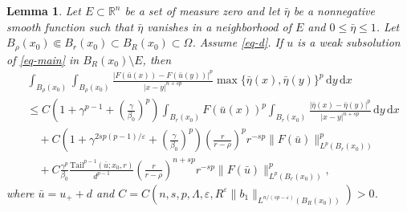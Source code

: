 \documentclass[11pt]{amsart}
\theoremstyle{plain}
\newtheorem{lemma}[theorem]{Lemma}
\theoremstyle{definition}
\numberwithin{equation}{section}
\begin{document}
\begin{lemma}\label{lem-Caccio2}
Let $E \subset \mathbb{R}^n$ be a set of measure zero and let $\bar{\eta}$ be a nonnegative smooth function such that $\bar{\eta}$ vanishes in a neighborhood of $E$ and $0\leq\bar{\eta}\leq1$. Let $B_\rho(x_0) \Subset B_r(x_0) \subset B_R(x_0) \subset \Omega$. Assume \eqref{eq-d}. If $u$ is a weak subsolution of \eqref{eq-main} in $B_R(x_0) \setminus E$, then
\begin{equation}\label{eq-Caccio2}
\begin{split}
&\int_{B_\rho(x_0)} \int_{B_\rho(x_0)} \frac{|F(\bar{u}(x))-F(\bar{u}(y))|^p}{|x-y|^{n+sp}} \max\{ \bar{\eta}(x), \bar{\eta}(y) \}^p \,\mathrm{d}y \,\mathrm{d}x \\
&\leq C\left( 1+\gamma^{p-1}+\left( \frac{\gamma}{\beta_0} \right)^p \right) \int_{B_r(x_0)} F(\bar{u}(x))^p \int_{B_r(x_0)} \frac{|\bar{\eta}(x)-\bar{\eta}(y)|^p}{|x-y|^{n+sp}} \,\mathrm{d}y\,\mathrm{d}x \\
&\quad + C\left( 1+\gamma^{2sp(p-1)/\varepsilon}+\left( \frac{\gamma}{\beta_0} \right)^p \right) \left( \frac{r}{r-\rho} \right)^p r^{-sp}\|F(\bar{u})\|_{L^p(B_r(x_0))}^p \\
&\quad + C\frac{\gamma^p}{\beta_0} \frac{\mathrm{Tail}^{p-1}(\bar{u}; x_0, r)}{d^{p-1}} \left( \frac{r}{r-\rho} \right)^{n+sp} r^{-sp}\|F(\bar{u})\|_{L^p(B_r(x_0))}^p,
\end{split}
\end{equation}
where $\bar{u}=u_++d$ and $C=C(n, s, p, \Lambda, \varepsilon, R^{\varepsilon}\|b_1\|_{L^{n/(sp-\varepsilon)}(B_R(x_0))})>0$.
\end{lemma}
\end{document}

